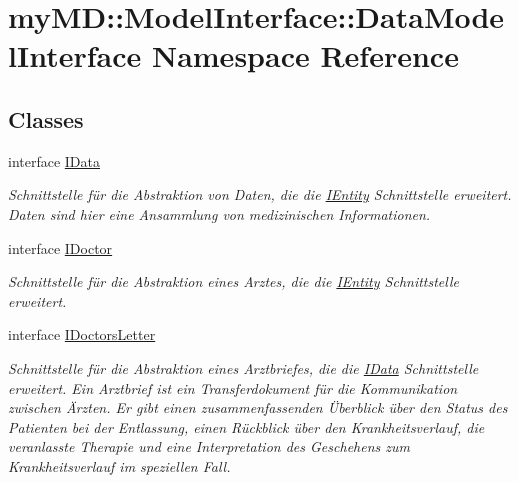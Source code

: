 \hypertarget{namespacemy_m_d_1_1_model_interface_1_1_data_model_interface}{
\section{my\-MD::Model\-Interface::Data\-Model\-Interface Namespace Reference}
\label{d5/d73/namespacemy_m_d_1_1_model_interface_1_1_data_model_interface}
}


\subsection*{Classes}
\begin{CompactItemize}
\item 
interface \hyperlink{interfacemy_m_d_1_1_model_interface_1_1_data_model_interface_1_1_i_data}{IData}
\begin{CompactList}\small\item\em Schnittstelle f\"{u}r die Abstraktion von Daten, die die \hyperlink{interfacemy_m_d_1_1_model_interface_1_1_data_model_interface_1_1_i_entity}{IEntity} Schnittstelle erweitert. Daten sind hier eine Ansammlung von medizinischen Informationen. \item\end{CompactList}\item 
interface \hyperlink{interfacemy_m_d_1_1_model_interface_1_1_data_model_interface_1_1_i_doctor}{IDoctor}
\begin{CompactList}\small\item\em Schnittstelle f\"{u}r die Abstraktion eines Arztes, die die \hyperlink{interfacemy_m_d_1_1_model_interface_1_1_data_model_interface_1_1_i_entity}{IEntity} Schnittstelle erweitert. \item\end{CompactList}\item 
interface \hyperlink{interfacemy_m_d_1_1_model_interface_1_1_data_model_interface_1_1_i_doctors_letter}{IDoctors\-Letter}
\begin{CompactList}\small\item\em Schnittstelle f\"{u}r die Abstraktion eines Arztbriefes, die die \hyperlink{interfacemy_m_d_1_1_model_interface_1_1_data_model_interface_1_1_i_data}{IData} Schnittstelle erweitert. Ein Arztbrief ist ein Transferdokument f\"{u}r die Kommunikation zwischen \"{A}rzten. Er gibt einen zusammenfassenden \"{U}berblick \"{u}ber den Status des Patienten bei der Entlassung, einen R\"{u}ckblick \"{u}ber den Krankheitsverlauf, die veranlasste Therapie und eine Interpretation des Geschehens zum Krankheitsverlauf im speziellen Fall. \item\end{CompactList}\item 

\end{CompactItemize}
